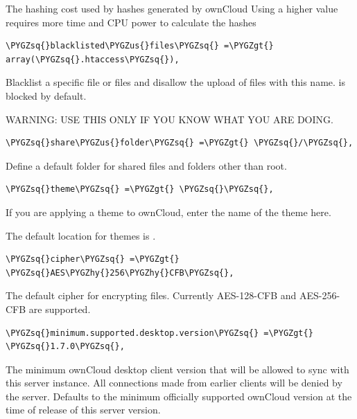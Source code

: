 \documentclass[letterpaper,10pt,english]{sphinxmanual}
\def\PYGZus{\char`\_}
\def\PYGZgt{\char`\>}
\def\PYGZhy{\char`\-}
\def\PYGZsq{\char`\'}
\renewcommand\PYGZsq{\textquotesingle}
\begin{document}
The hashing cost used by hashes generated by ownCloud
Using a higher value requires more time and CPU power to calculate the hashes

\begin{Verbatim}[commandchars=\\\{\}]
\PYGZsq{}blacklisted\PYGZus{}files\PYGZsq{} =\PYGZgt{} array(\PYGZsq{}.htaccess\PYGZsq{}),
\end{Verbatim}

Blacklist a specific file or files and disallow the upload of files
with this name.  is blocked by default.

WARNING: USE THIS ONLY IF YOU KNOW WHAT YOU ARE DOING.

\begin{Verbatim}[commandchars=\\\{\}]
\PYGZsq{}share\PYGZus{}folder\PYGZsq{} =\PYGZgt{} \PYGZsq{}/\PYGZsq{},
\end{Verbatim}

Define a default folder for shared files and folders other than root.

\begin{Verbatim}[commandchars=\\\{\}]
\PYGZsq{}theme\PYGZsq{} =\PYGZgt{} \PYGZsq{}\PYGZsq{},
\end{Verbatim}

If you are applying a theme to ownCloud, enter the name of the theme here.

The default location for themes is .

\begin{Verbatim}[commandchars=\\\{\}]
\PYGZsq{}cipher\PYGZsq{} =\PYGZgt{} \PYGZsq{}AES\PYGZhy{}256\PYGZhy{}CFB\PYGZsq{},
\end{Verbatim}

The default cipher for encrypting files. Currently AES-128-CFB and
AES-256-CFB are supported.

\begin{Verbatim}[commandchars=\\\{\}]
\PYGZsq{}minimum.supported.desktop.version\PYGZsq{} =\PYGZgt{} \PYGZsq{}1.7.0\PYGZsq{},
\end{Verbatim}

The minimum ownCloud desktop client version that will be allowed to sync with
this server instance. All connections made from earlier clients will be denied
by the server. Defaults to the minimum officially supported ownCloud version at
the time of release of this server version.
\end{document}
